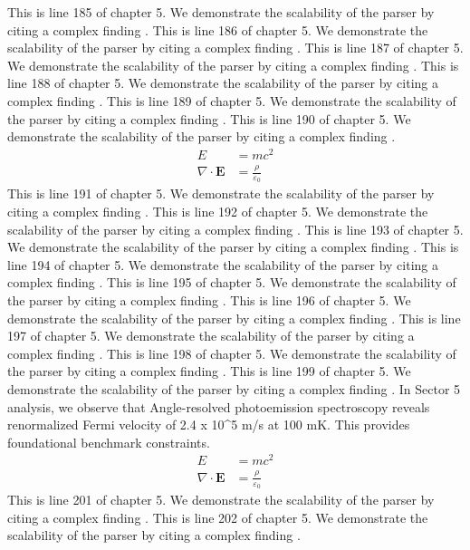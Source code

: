 This is line 185 of chapter 5. We demonstrate the scalability of the parser by citing a complex finding \cite{ref5_185}.
This is line 186 of chapter 5. We demonstrate the scalability of the parser by citing a complex finding \cite{ref5_186}.
This is line 187 of chapter 5. We demonstrate the scalability of the parser by citing a complex finding \cite{ref5_187}.
This is line 188 of chapter 5. We demonstrate the scalability of the parser by citing a complex finding \cite{ref5_188}.
This is line 189 of chapter 5. We demonstrate the scalability of the parser by citing a complex finding \cite{ref5_189}.
This is line 190 of chapter 5. We demonstrate the scalability of the parser by citing a complex finding \cite{ref5_190}.
\begin{align*}
  E &= mc^2 \\
  \nabla \cdot \mathbf{E} &= \frac{\rho}{\varepsilon_0}
\end{align*}
This is line 191 of chapter 5. We demonstrate the scalability of the parser by citing a complex finding \cite{ref5_191}.
This is line 192 of chapter 5. We demonstrate the scalability of the parser by citing a complex finding \cite{ref5_192}.
This is line 193 of chapter 5. We demonstrate the scalability of the parser by citing a complex finding \cite{ref5_193}.
This is line 194 of chapter 5. We demonstrate the scalability of the parser by citing a complex finding \cite{ref5_194}.
This is line 195 of chapter 5. We demonstrate the scalability of the parser by citing a complex finding \cite{ref5_195}.
This is line 196 of chapter 5. We demonstrate the scalability of the parser by citing a complex finding \cite{ref5_196}.
This is line 197 of chapter 5. We demonstrate the scalability of the parser by citing a complex finding \cite{ref5_197}.
This is line 198 of chapter 5. We demonstrate the scalability of the parser by citing a complex finding \cite{ref5_198}.
This is line 199 of chapter 5. We demonstrate the scalability of the parser by citing a complex finding \cite{ref5_199}.
In Sector 5 analysis, we observe that Angle-resolved photoemission spectroscopy reveals renormalized Fermi velocity of 2.4 x 10^5 m/s at 100 mK. This provides foundational benchmark constraints.
\begin{align*}
  E &= mc^2 \\
  \nabla \cdot \mathbf{E} &= \frac{\rho}{\varepsilon_0}
\end{align*}
This is line 201 of chapter 5. We demonstrate the scalability of the parser by citing a complex finding \cite{ref5_201}.
This is line 202 of chapter 5. We demonstrate the scalability of the parser by citing a complex finding \cite{ref5_202}.
